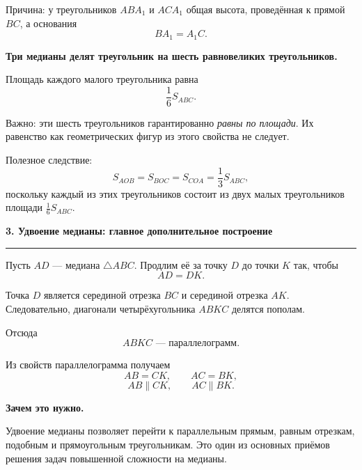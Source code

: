 \documentclass[a4paper,12pt]{article}
\newcommand{\checksection}[1]{%
  \vspace{0.7em}%
  {\Large\bfseries\color{darkaccent}#1}\par
  \vspace{0.25em}
  {\color{rulegray}\rule{\linewidth}{0.6pt}}\par
  \vspace{0.5em}
}
\newcommand{\key}[1]{\textbf{\color{darkaccent}#1}}
\newcommand{\SABC}{S_{ABC}}
\begin{document}
Причина: у треугольников $ABA_1$ и $ACA_1$ общая высота,
проведённая к прямой $BC$, а основания
\[
BA_1=A_1C.
\]

\key{Три медианы делят треугольник на шесть равновеликих
треугольников.}

Площадь каждого малого треугольника равна
\[
\boxed{\frac16\SABC}.
\]

Важно: эти шесть треугольников гарантированно
\emph{равны по площади}. Их равенство как геометрических фигур
из этого свойства не следует.

Полезное следствие:
\[
S_{AOB}=S_{BOC}=S_{COA}
=
\frac13\SABC,
\]
поскольку каждый из этих треугольников состоит из двух малых
треугольников площади $\frac16\SABC$.


\checksection{3. Удвоение медианы: главное дополнительное построение}

Пусть $AD$ --- медиана $\triangle ABC$.
Продлим её за точку $D$ до точки $K$ так, чтобы
\[
AD=DK.
\]

Точка $D$ является серединой отрезка $BC$ и серединой отрезка
$AK$. Следовательно, диагонали четырёхугольника $ABKC$
делятся пополам.

Отсюда
\[
\boxed{ABKC\text{ --- параллелограмм}.}
\]

\begin{center}
\end{center}

Из свойств параллелограмма получаем
\[
AB=CK,
\qquad
AC=BK,
\]
\[
AB\parallel CK,
\qquad
AC\parallel BK.
\]

\key{Зачем это нужно.}

Удвоение медианы позволяет перейти к параллельным прямым,
равным отрезкам, подобным и прямоугольным треугольникам.
Это один из основных приёмов решения задач повышенной
сложности на медианы.
\end{document}
